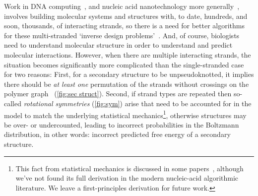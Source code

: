 \documentclass[11pt,letterpaper]{article}  \usepackage[margin=1in]{geometry}
\theoremstyle{definition}  \newtheorem{Definition}[theorem]{Definition}
\begin{document}
Work in DNA computing~\cite{algoSST,squareRoot,cargoSorting,SIMDDNA,celltimer2017fernshulman,Chatterjee2017,seelig2006enzyme,zhang2011dynamic}, and nucleic acid nanotechnology more generally~\cite{geary2014single,woo2011programmable}, involves building molecular systems and structures with, to date, hundreds, and soon, thousands, of interacting strands, so there is a need for better algorithms for these multi-stranded `inverse design problems'~\cite{churkin2018design,nuad}.  
And, of course, biologists need to understand molecular structure in order to understand and predict molecular interactions. 
However, when there are multiple interacting strands, the situation becomes significantly more complicated than the single-stranded case for two reasons:  
First, for a secondary structure to be unpseudoknotted, it implies there should be {\em at least one} permutation of the strands without crossings on the polymer graph~\cite{dirks2007thermodynamic} (\cref{fig:sec struct}). 
Second, if strand types are repeated then 
so-called {\em rotational symmetries} (\cref{fig:sym}) arise that need to be accounted for in the model to match the underlying statistical mechanics\footnote{This fact from statistical mechanics is discussed in some papers~\cite{dirks2007thermodynamic,hofacker2012symmetric}, although we've not found its full derivation in the modern nucleic-acid algorithmic literature. We leave a first-principles derivation for future work.\label{ft:statmech}}, otherwise structures may be over- or undercounted, leading to incorrect probabilities in the Boltzmann distribution, in other words: incorrect predicted free energy of a secondary structure.
\end{document}
